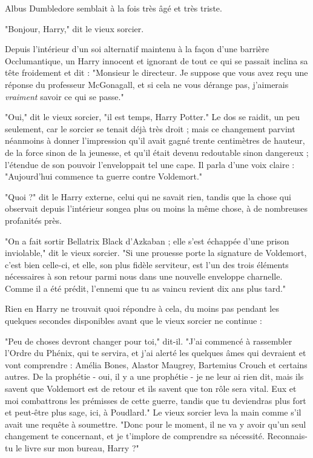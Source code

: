 Albus Dumbledore semblait à la fois très âgé et très triste.

"Bonjour, Harry," dit le vieux sorcier.

Depuis l'intérieur d'un soi alternatif maintenu à la façon d'une barrière Occlumantique, un Harry innocent et ignorant de tout ce qui se passait inclina sa tête froidement et dit : "Monsieur le directeur. Je suppose que vous avez reçu une réponse du professeur McGonagall, et si cela ne vous dérange pas, j'aimerais \emph{vraiment}  savoir ce qui se passe."

"Oui," dit le vieux sorcier, "il est temps, Harry Potter." Le dos se raidit, un peu seulement, car le sorcier se tenait déjà très droit ; mais ce changement parvint néanmoins à donner l'impression qu'il avait gagné trente centimètres de hauteur, de la force sinon de la jeunesse, et qu'il était devenu redoutable sinon dangereux ; l'étendue de son pouvoir l'enveloppait tel une cape. Il parla d'une voix claire : "Aujourd'hui commence ta guerre contre Voldemort."

"Quoi ?" dit le Harry externe, celui qui ne savait rien, tandis que la chose qui observait depuis l'intérieur songea plus ou moins la même chose, à de nombreuses profanités près.

"On a fait sortir Bellatrix Black d'Azkaban ; elle s'est échappée d'une prison inviolable," dit le vieux sorcier. "Si une prouesse porte la signature de Voldemort, c'est bien celle-ci, et elle, son plus fidèle serviteur, est l'un des trois éléments nécessaires à son retour parmi nous dans une nouvelle enveloppe charnelle. Comme il a été prédit, l'ennemi que tu as vaincu revient dix ans plus tard."

Rien en Harry ne trouvait quoi répondre à cela, du moins pas pendant les quelques secondes disponibles avant que le vieux sorcier ne continue :

"Peu de choses devront changer pour toi," dit-il. "J'ai commencé à rassembler l'Ordre du Phénix, qui te servira, et j'ai alerté les quelques âmes qui devraient et vont comprendre : Amélia Bones, Alastor Maugrey, Bartemius Crouch et certains autres. De la prophétie - oui, il y a une prophétie - je ne leur ai rien dit, mais ils savent que Voldemort est de retour et ils savent que ton rôle sera vital. Eux et moi combattrons les prémisses de cette guerre, tandis que tu deviendras plus fort et peut-être plus sage, ici, à Poudlard." Le vieux sorcier leva la main comme s'il avait une requête à soumettre. "Donc pour le moment, il ne va y avoir qu'un seul changement te concernant, et je t'implore de comprendre sa nécessité. Reconnais-tu le livre sur mon bureau, Harry ?"

